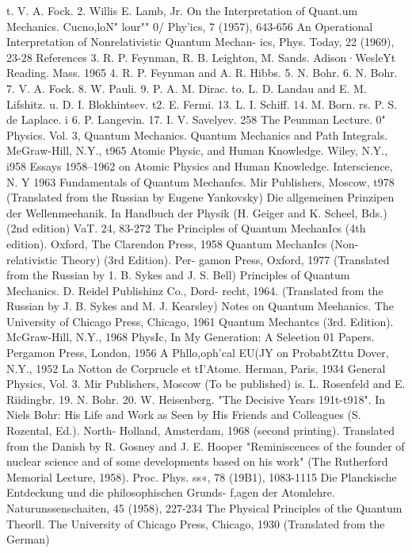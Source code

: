 \documentclass[a4paper,sfsidenotes,colorlinks=true]{tufte-book}
\numberwithin{equation}{section}
\numberwithin{figure}{section}
\begin{document}
{{{{{{{\cleardoublepage
t. V. A. Fock. 2. Willis E. Lamb, Jr.
On the Interpretation of Quant.um Mechanics. Cucno,loN" lour"" 0/ Phy'ics, 7 (1957), 643-656
An Operational Interpretation of Nonrelativistic Quantum Mechan- ics, Phys. Today, 22 (1969), 23-28
References
3. R. P. Feynman, R. B. Leighton, M. Sands. Adison·WesleYt Reading. Mass. 1965
4. R. P. Feynman and A. R. Hibbs.
5. N. Bohr. 6. N. Bohr.
7. V. A. Fock. 8. W. Pauli.
9. P. A. M. Dirac.
to. L. D. Landau and E. M. Lifshitz.
u. D. I. Blokhintsev.
t2. E. Fermi.
13. L. I. Schiff. 14. M. Born.
rs. P. S. de Laplace. i 6. P. Langevin.
17. I. V. Savelyev.
258
The Peunman Lecture. 0" Physics. Vol. 3, Quantum Mechanics. Quantum Mechanics and Path Integrals. MeGraw-Hill, N.Y.,
t965 Atomic Physic, and Human Knowledge. Wiley, N.Y., i958
Essays 1958--1962 on Atomic Physics and Human Knowledge. Interscience, N. Y 1963
Fundamentals of Quantum Mechanfcs. Mir Publishers, Moscow, t978 (Translated from the Russian by Eugene Yankovsky)
Die allgemeinen Prinzipen der Wellenmeehanik. In Handbuch der Physik (H. Geiger and K. Scheel, Bds.) (2nd edition) VaT. 24, 83-272
The Principles of Quantum MechanIcs (4th edition). Oxford, The Clarendon Press, 1958
Quantum MechanIcs (Non-relativistic Theory) (3rd Edition). Per- gamon Press, Oxford, 1977 (Translated from the Russian by
1. B. Sykes and J. S. Bell)
Principles of Quantum Mechanics. D. Reidel Publishinz Co., Dord- recht, 1964. (Translated from the Russian by J. B. Sykes and M. J. Kearsley)
Notes on Quantum Meehanics. The University of Chicago Press, Chicago, 1961
Quantum Mechantcs (3rd. Edition). McGraw-Hill, N.Y., 1968 PhysIc, In My Generation: A Seleetion 01 Papers. Pergamon Press,
London, 1956 A Phllo,oph'cal EU(JY on ProbabtZttu Dover, N.Y., 1952
La Notton de Corprucle et tI'Atome. Herman, Paris, 1934 General Physics, Vol. 3. Mir Publishers, Moscow (To be published)
is. L. Rosenfeld and E. Riidingbr.
19. N. Bohr.
20. W. Heisenberg.
"The Decisive Years 191t-t918". In Niels Bohr: His Life and Work as Seen by His Friends and Colleagues (S. Rozental, Ed.). North- Holland, Amsterdam, 1968 (second printing). Translated from the
Danish by R. Gosney and J. E. Hooper
"Reminiscences of the founder of nuclear science and of some developments based on his work" (The Rutherford Memorial Lecture, 1958). Proc. Phys. ss«, 78 (19B1), 1083-1115
Die Planckische Entdeckung und die philosophischen Grunds- f,agen der Atomlehre. Naturunssenschaiten, 45 (1958), 227-234
The Physical Principles of the Quantum Theorll. The University of Chicago Press, Chicago, 1930 (Translated from the German)
}}}}}}}
\end{document}
